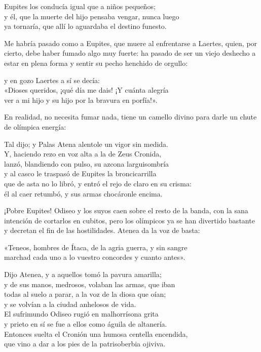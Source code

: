 \begin{versocita}
Eupites los conducía igual que a niños pequeños;\\
y él, que la muerte del hijo pensaba vengar, nunca luego\\
ya tornaría, que allí lo aguardaba el destino funesto.
\end{versocita}

Me habría pasado como a Eupites, que muere al enfrentarse a Laertes, quien, por cierto, debe haber fumado algo muy fuerte: ha pasado de ser un viejo deshecho a estar en plena forma y sentir su pecho henchido de orgullo:

\begin{versocita}
[...] y en gozo Laertes a sí se decía:\\
«Dioses queridos, ¡qué día me dais! ¡Y cuánta alegría\\
ver a mi hijo y su hijo por la bravura en porfía!».
\end{versocita}

En realidad, no necesita fumar nada, tiene un camello divino para darle un chute de olímpica energía:

\begin{versocita}
Tal dijo; y Palas Atena alentole un vigor sin medida.\\
Y, haciendo rezo en voz alta a la de Zeus Cronida,\\
lanzó, blandiendo con pulso, su azcona larguisombría\\
y al casco le traspasó de Eupites la broncicarrilla\\
que de asta no lo libró, y entró el rejo de claro en su crisma:\\
él al caer retumbó, y sus armas chocáronle encima.
\end{versocita}

¡Pobre Eupites! Odiseo y los suyos caen sobre el resto de la banda, con la sana intención de cortarlos en cubitos, pero los olímpicos ya se han divertido bastante y decretan el fin de las hostilidades. Atenea da la voz de basta:

\begin{versocita}
«Teneos, hombres de Ítaca, de la agria guerra, y sin sangre\\
marchad cada uno a lo vuestro concordes y cuanto antes».
\end{versocita}

\begin{versocita}
Dijo Atenea, y a aquellos tomó la pavura amarilla;\\
y de sus manos, medrosos, volaban las armas, que iban\\
todas al suelo a parar, a la voz de la diosa que oían;\\
y se volvían a la ciudad anhelosos de vida.\\
El sufrimundo Odiseo rugió en malhorrísona grita\\
y prieto en sí se fue a ellos como águila de altanería.\\
Entonces suelta el Cronión una humosa centella encendida,\\
que vino a dar a los pies de la patrisoberbia ojiviva.
\end{versocita}

